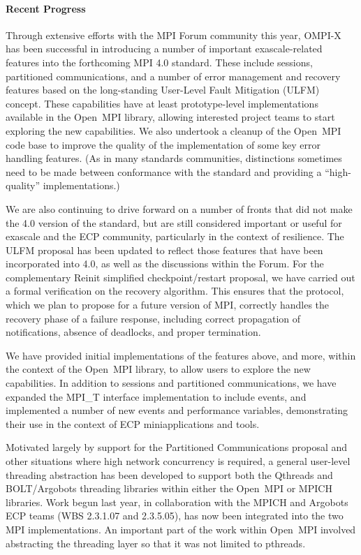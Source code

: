 \paragraph{Recent Progress}
Through extensive efforts with the MPI Forum community this year, OMPI-X has been successful in 
introducing a number of important exascale-related features into the forthcoming MPI 4.0 standard.
These include sessions, partitioned communications, and a number of error management and recovery features
based on the long-standing User-Level Fault Mitigation (ULFM) concept.  These capabilities have at least
prototype-level implementations available in the Open~MPI library, allowing interested project teams to start
exploring the new capabilities.  We also undertook a cleanup of the Open~MPI code base to improve the quality
of the implementation of some key error handling features. (As in many standards communities, distinctions 
sometimes need to be made between conformance with the standard and providing a ``high-quality'' implementations.)

We are also continuing to drive forward on a number of fronts that did not make the 4.0 version of the standard,
but are still considered important or useful for exascale and the ECP community, particularly in the context of resilience. The ULFM
proposal has been updated to reflect those features that have been incorporated into 4.0, as well as the discussions
within the Forum.  For the complementary Reinit simplified checkpoint/restart proposal, we have carried out a formal verification on the recovery algorithm. 
This ensures that the protocol, which we plan to propose for a future version of MPI, correctly handles the recovery phase 
of a failure response, including correct propagation of notifications, absence of deadlocks, and proper termination.

We have provided initial implementations of the features above, and more, within the context of the Open~MPI library, to allow
users to explore the new capabilities.  In addition to sessions and partitioned communications, we have expanded the
MPI\_T interface implementation to include events, and implemented a number of new events and performance variables,
demonstrating their use in the context of ECP miniapplications and tools.

Motivated largely by support for the Partitioned Communications proposal and other situations where high network 
concurrency is required, a general user-level threading abstraction has been developed to support both the Qthreads 
and BOLT/Argobots threading libraries within either the Open~MPI or MPICH libraries.  Work begun last year, in 
collaboration with the MPICH and Argobots ECP teams (WBS 2.3.1.07 and 2.3.5.05), has now been integrated into the two MPI implementations.
An important part of the work within Open~MPI involved abstracting the threading layer so that it was not limited to pthreads.

